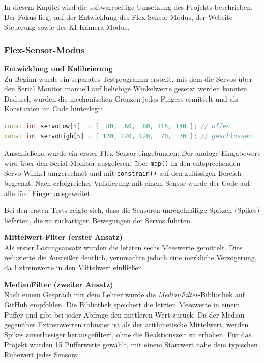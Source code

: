 \documentclass[12pt,a4paper]{article}
\begin{document}
In diesem Kapitel wird die softwareseitige Umsetzung des Projekts beschrieben. Der Fokus liegt auf der Entwicklung des Flex-Sensor-Modus, der Website-Steuerung sowie des KI-Kamera-Modus.

\subsubsection{Flex-Sensor-Modus}
\vspace{0.5em}

\textbf{Entwicklung und Kalibrierung} \\
Zu Beginn wurde ein separates Testprogramm erstellt, mit dem die Servos über den Serial Monitor manuell auf beliebige Winkelwerte gesetzt werden konnten. Dadurch wurden die mechanischen Grenzen jedes Fingers ermittelt und als Konstanten im Code hinterlegt:

\begin{lstlisting}[language=C++, caption={Servo-Grenzwerte für Hand 1}]
const int servoLow[5]  = {  80,  60,  80, 115, 140 }; // offen
const int servoHigh[5] = { 120, 120, 120,  70,  70 }; // geschlossen
\end{lstlisting}

Anschließend wurde ein erster Flex-Sensor eingebunden: Der analoge Eingabewert wird über den Serial Monitor ausgelesen, über \texttt{map()} in den entsprechenden Servo-Winkel umgerechnet und mit \texttt{constrain()} auf den zulässigen Bereich begrenzt. Nach erfolgreicher Validierung mit einem Sensor wurde der Code auf alle fünf Finger ausgeweitet.

\vspace{0.5em}
Bei den ersten Tests zeigte sich, dass die Sensoren unregelmäßige Spitzen (Spikes) lieferten, die zu ruckartigen Bewegungen der Servos führten.

\textbf{Mittelwert-Filter (erster Ansatz)} \\
Als erster Lösungsansatz wurden die letzten sechs Messwerte gemittelt. Dies reduzierte die Ausreißer deutlich, verursachte jedoch eine merkliche Verzögerung, da Extremwerte in den Mittelwert einfließen.

\vspace{0.5em}
\textbf{MedianFilter (zweiter Ansatz)} \\
Nach einem Gespräch mit dem Lehrer wurde die \textit{MedianFilter}-Bibliothek auf GitHub empfohlen. Die Bibliothek speichert die letzten Messwerte in einem Puffer und gibt bei jeder Abfrage den mittleren Wert zurück. Da der Median gegenüber Extremwerten robuster ist als der arithmetische Mittelwert, werden Spikes zuverlässiger herausgefiltert, ohne die Reaktionszeit zu erhöhen. Für das Projekt wurden 15 Pufferwerte gewählt, mit einem Startwert nahe dem typischen Ruhewert jedes Sensors:
\end{document}
